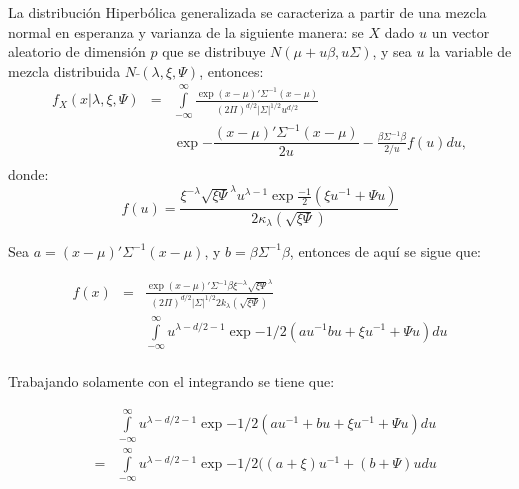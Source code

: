 La distribución Hiperbólica generalizada se caracteriza a partir de una mezcla normal en esperanza y varianza de la siguiente manera: se $X$ dado $u$ un vector aleatorio de dimensión $p$ que se distribuye $N(\mu+u\beta,u\Sigma)$, y sea $u$ la variable de mezcla distribuida $N\bar{}(\lambda,\xi,\Psi)$, entonces:
\begin{eqnarray*}
f_{X}(x|\lambda,\xi,\Psi) & = &\underset{-\infty }{\overset{\infty }{\int }}\frac{\exp{(x-\mu)'\Sigma^{-1}(x-\mu)}}{(2\Pi)^{d/2}|\Sigma|^{1/2}u^{d/2}}\\
& & \exp{-
	\dfrac{(x-\mu)'\Sigma^{-1}(x-\mu)}{2u}}-\frac{\beta\Sigma^{-1}\beta}{2/u}f(u)du,\\
\end{eqnarray*}
donde:
\begin{equation*}
f(u)=\dfrac{\xi^{-\lambda}\sqrt{\xi\Psi}^{\lambda}u^{\lambda-1}\exp{\frac{-1}{2}(\xi u^{-1} + \Psi u)}}{2\kappa_{\lambda}(\sqrt{\xi\Psi})} 
\end{equation*}

Sea $a=(x-\mu)'\Sigma^{-1}(x-\mu)$, y $b=\beta\Sigma^{-1}\beta$, entonces de aquí se sigue que:

\begin{eqnarray*}
f(x)&=&\frac{\exp{(x-\mu)'\Sigma^{-1}\beta}\xi^{-\lambda}\sqrt{\xi\Psi}^{\lambda}}{(2\Pi)^{d/2}|\Sigma|^{1/2}2k_{\lambda}(\sqrt{\xi\Psi})}\\
& & \underset{-\infty }{\overset{\infty }{\int }}u^{\lambda - d/2 -1}\exp{-1/2(au^{-1}bu+\xi u^{-1}+\Psi u)}du\\
\end{eqnarray*}

Trabajando solamente con el integrando se tiene que:

\begin{eqnarray*}
& &\underset{-\infty }{\overset{\infty }{\int }}u^{\lambda - d/2 -1}\exp{-1/2(au^{-1}+bu+\xi u^{-1}+\Psi u)}du\\
&=&\underset{-\infty }{\overset{\infty }{\int }}u^{\lambda -d/2 -1}\exp{-1/2((a+\xi)u^{-1}+(b+\Psi)u} du\\
\end{eqnarray*}



